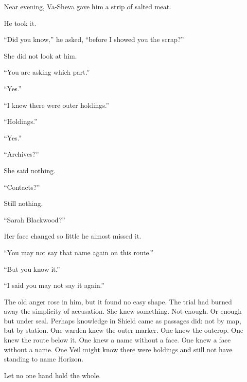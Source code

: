 Near evening, Va-Sheva gave him a strip of salted meat.\par

He took it.\par

“Did you know,” he asked, “before I showed you the scrap?”\par

She did not look at him.\par

“You are asking which part.”\par

“Yes.”\par

“I knew there were outer holdings.”\par

“Holdings.”\par

“Yes.”\par

“Archives?”\par

She said nothing.\par

“Contacts?”\par

Still nothing.\par

“Sarah Blackwood?”\par

Her face changed so little he almost missed it.\par

“You may not say that name again on this route.”\par

“But you know it.”\par

“I said you may not say it again.”\par

The old anger rose in him, but it found no easy shape. The trial had burned away the simplicity of accusation. She knew something. Not enough. Or enough but under seal. Perhaps knowledge in Shield came as passages did: not by map, but by station. One warden knew the outer marker. One knew the outcrop. One knew the route below it. One knew a name without a face. One knew a face without a name. One Veil might know there were holdings and still not have standing to name Horizon.\par

Let no one hand hold the whole.\par

